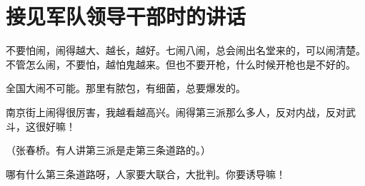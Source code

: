 \section[接见军队领导干部时的讲话（一九六七年七月十三日）]{接见军队领导干部时的讲话}


不要怕闹，闹得越大、越长，越好。七闹八闹，总会闹出名堂来的，可以闹清楚。不管怎么闹，不要怕，越怕鬼越来。但也不要开枪，什么时候开枪也是不好的。

全国大闹不可能。那里有脓包，有细菌，总要爆发的。

南京街上闹得很厉害，我越看越高兴。闹得第三派那么多人，反对内战，反对武斗，这很好嘛！

（张春桥。有人讲第三派是走第三条道路的。）

哪有什么第三条道路呀，人家要大联合，大批判。你要诱导嘛！

